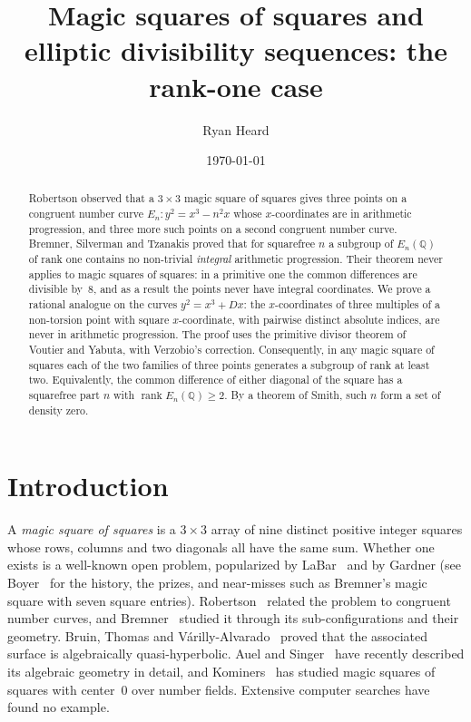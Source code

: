 \documentclass[11pt]{amsart}
\title[Magic squares of squares: the rank-one case]{Magic squares of squares and elliptic divisibility
sequences: the rank-one case}
\author{Ryan Heard}
\date{\today}
\theoremstyle{definition}
\theoremstyle{remark}
\newcommand{\Q}{\mathbb{Q}}
\DeclareMathOperator{\rk}{rank}
\begin{document}
\begin{abstract}
Robertson observed that a $3\times3$ magic square of squares gives three points on a congruent number
curve $E_n\colon y^2=x^3-n^2x$ whose $x$-coordinates are in arithmetic progression, and three more such
points on a second congruent number curve. Bremner, Silverman and Tzanakis proved that for squarefree $n$
a subgroup of $E_n(\Q)$ of rank one contains no non-trivial \emph{integral} arithmetic progression. Their
theorem never applies to magic squares of squares: in a primitive one the common differences are
divisible by~$8$, and as a result the points never have integral coordinates. We prove a
rational analogue on the curves $y^2=x^3+Dx$: the $x$-coordinates of three multiples of a non-torsion
point with square $x$-coordinate, with pairwise distinct absolute indices, are never in arithmetic
progression. The proof uses the primitive divisor theorem of Voutier and Yabuta, with Verzobio's
correction. Consequently, in any magic square of squares each of the two families of three points
generates a subgroup of rank at least two. Equivalently, the common difference of either diagonal of the
square has a squarefree part $n$ with $\rk E_n(\Q)\ge2$. By a theorem of Smith, such $n$ form a set of
density zero.
\end{abstract}

\maketitle

\section{Introduction}

A \emph{magic square of squares} is a $3\times3$ array of nine distinct positive integer squares whose
rows, columns and two diagonals all have the same sum. Whether one exists is a well-known open problem,
popularized by LaBar~\cite{LaBar} and by Gardner (see Boyer~\cite{Boyer} for the history, the prizes, and
near-misses such as Bremner's magic square with seven square entries). Robertson~\cite{Robertson} related
the problem to congruent number curves, and Bremner~\cite{Bremner99,Bremner01} studied it through its
sub-configurations and their geometry. Bruin, Thomas and V\'arilly-Alvarado~\cite{BTVA} proved that the
associated surface is algebraically quasi-hyperbolic. Auel and Singer~\cite{AS} have recently described
its algebraic geometry in detail, and Kominers~\cite{Kominers} has studied magic squares of squares with
center~$0$ over number fields. Extensive computer searches have found no example.
\end{document}
